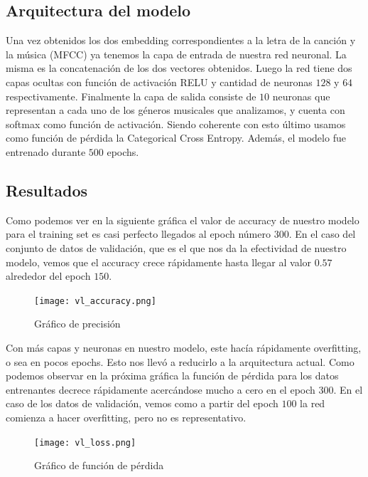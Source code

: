 \documentclass[colorinlistoftodos,twoside,twocolumn,10pt]{article} %
\begin{document}
\subsection{Arquitectura del modelo}

Una vez obtenidos los dos embedding correspondientes a la letra de la canci\'on y la m\'usica (MFCC) ya tenemos la capa de entrada de nuestra red neuronal. La misma es la concatenaci\'on de los dos vectores obtenidos. Luego la red tiene  dos capas ocultas con funci\'on de activaci\'on RELU y cantidad de neuronas $128$ y $64$ respectivamente. Finalmente la capa de salida consiste de $10$ neuronas que representan a cada uno de los g\'eneros musicales que analizamos, y cuenta con softmax como funci\'on de activaci\'on. Siendo coherente con esto \'ultimo usamos como funci\'on de p\'erdida la Categorical Cross Entropy. Adem\'as, el modelo fue entrenado durante $500$ epochs.


\subsection{Resultados}

Como podemos ver en la siguiente gr\'afica el valor de accuracy de nuestro modelo para el training set es casi perfecto llegados al epoch n\'umero $300$. En el caso del conjunto de  datos de validaci\'on, que es el que nos da la efectividad de nuestro modelo, vemos que el accuracy crece r\'apidamente hasta llegar al valor $0.57$ alrededor del epoch $150$.

\begin{figure}[h!]
	\centering
	\texttt{[image: vl\_accuracy.png]}
	\caption{Gr\'afico de precisi\'on}
\end{figure}

Con m\'as capas y neuronas en nuestro modelo, este hac\'ia r\'apidamente overfitting, o sea en pocos epochs. Esto nos llev\'o a reducirlo a la arquitectura actual. Como podemos observar en la pr\'oxima gr\'afica la funci\'on de p\'erdida para los datos entrenantes decrece r\'apidamente acerc\'andose mucho a cero en el epoch $300$. En el caso de los datos de validaci\'on, vemos como a partir del epoch $100$ la red comienza a hacer overfitting, pero no es representativo. 

\begin{figure}[h!]
	\centering
	\texttt{[image: vl\_loss.png]}
	\caption{Gr\'afico de funci\'on de p\'erdida}
\end{figure}

\end{document}
